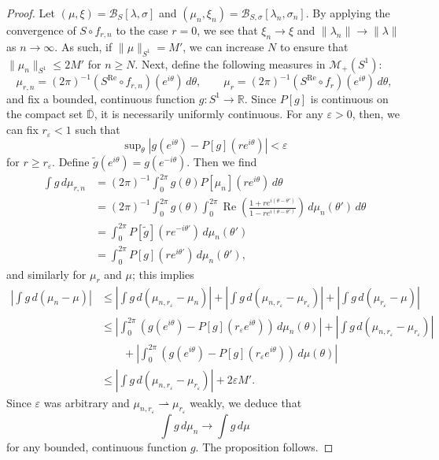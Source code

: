 \documentclass{cams-l} %
\newcommand{\RR}{\mathbb R}
\newcommand{\DD}{\mathbb D}
\newcommand{\cM}{\mathcal M}
\newcommand{\cB}{\mathcal B}
\newcommand{\eps}{\varepsilon}
\newcommand{\ovl}[1]{{\overline{#1}}}
\newcommand{\op}{\operatorname}
\renewcommand{\Re}{\op{Re}}
\theoremstyle{definition}
\theoremstyle{remark}
\numberwithin{equation}{section}
\begin{document}
\begin{proof}
    Let $(\mu,\xi) = \cB_{S}[\lambda,\sigma]$ and $(\mu_n,\xi_n) = \cB_{S,\sigma}[\lambda_n,\sigma_n]$. By applying the convergence of $S\circ f_{r,n}$ to the case $r=0$, we see that $\xi_n\to\xi$ and $\|\lambda_n\|\to\|\lambda\|$ as $n\to\infty$. As such, if $\|\mu\|_{S^1} = M'$, we can increase $N$ to ensure that $\|\mu_n\|_{S^1}\leq 2M'$ for $n\geq N$. Next, define the following measures in $\cM_+(S^1)$:
    \[\mu_{r,n} = (2\pi)^{-1} (S^{\Re}\circ f_{r,n})(e^{i\theta})\,d\theta,\qquad \mu_r = (2\pi)^{-1} (S^{\Re}\circ f_r)(e^{i\theta})\,d\theta,\]
    and fix a bounded, continuous function $g:S^1\to\RR$. Since $P[g]$ is continuous on the compact set $\ovl{\DD}$, it is necessarily uniformly continuous. For any $\eps>0$, then, we can fix $r_\eps<1$ such that
    \[\sup\nolimits_\theta\left|g(e^{i\theta}) - P[g](re^{i\theta})\right|<\eps\]
    for $r\geq r_\eps$. Define $\widetilde{g}(e^{i\theta})=g(e^{-i\theta})$. Then we find
    \begin{align*}
        \int g\,d\mu_{r,n} &= (2\pi)^{-1}\int_0^{2\pi} g(\theta) P[\mu_n](re^{i\theta})\,d\theta\\
        &= (2\pi)^{-1}\int_0^{2\pi} g(\theta) \int_0^{2\pi} \Re\left(\frac{1+re^{i(\theta-\theta')}}{1-re^{i(\theta-\theta')}}\right)\,d\mu_n(\theta')\,d\theta\\
        &= \int_0^{2\pi} P[\widetilde{g}](re^{-i\theta'})\,d\mu_n(\theta')\\
        &= \int_0^{2\pi} P[g](re^{i\theta'})\,d\mu_n(\theta'),
    \end{align*}
    and similarly for $\mu_r$ and $\mu$; this implies
    \begin{align*}\left|\int g\,d(\mu_{n} - \mu) \right| &\leq \left|\int g\,d(\mu_{n,r_\eps} - \mu_n) \right| + \left|\int g\,d(\mu_{n,r_\eps}-\mu_{r_\eps}) \right| + \left|\int g \,d(\mu_{r_\eps} - \mu) \right|\\
    &\leq \left|\int_0^{2\pi} \left(g(e^{i\theta})-P[g](r_\eps e^{i\theta})\right)\,d\mu_n(\theta) \right| + \left|\int g\,d(\mu_{n,r_\eps}-\mu_{r_\eps}) \right| \\
    &\qquad+ \left|\int_0^{2\pi} \left(g(e^{i\theta})-P[g](r_\eps e^{i\theta})\right)\,d\mu(\theta) \right|\\
    &\leq \left|\int g\,d(\mu_{n,r_\eps}-\mu_{r_\eps}) \right| + 2\eps M'.
    \end{align*}
    Since $\eps$ was arbitrary and $\mu_{n,r_\eps}\rightharpoonup\mu_{r_\eps}$ weakly, we deduce that
    \[\int g\,d\mu_n\to \int g\,d\mu\]
    for any bounded, continuous function $g$. The proposition follows.
\end{proof}
\end{document}
